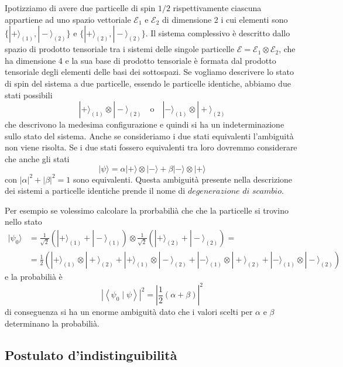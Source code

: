  
 Ipotizziamo di avere due particelle di spin $1/2$ rispettivamente ciascuna appartiene ad uno spazio vettoriale $\mathcal{E}_1$ e $\mathcal{E}_2$ di dimensione 2 i cui elementi sono $\{|+\rangle_{(1)},|-\rangle_{(2)}\}$ e $\{|+\rangle_{(2)},|-\rangle_{(2)}\}$. Il sistema complessivo \`e descritto dallo spazio di prodotto tensoriale tra i sistemi delle singole particelle $\mathcal{E} = \mathcal{E}_1 \otimes \mathcal{E}_2$, che ha dimensione 4 e la sua base di prodotto tensoriale \`e formata dal prodotto tensoriale degli elementi delle basi dei sottospazi. Se vogliamo descrivere lo stato di spin del sistema a due particelle, essendo le particelle identiche, abbiamo due stati possibili
 \begin{equation*}
 	|+\rangle_{(1)} \otimes |- \rangle_{(2)} \quad \text{o} \quad |-\rangle_{(1)} \otimes |+\rangle_{(2)}
 \end{equation*}
 che descrivono la medesima configurazione e quindi si ha un indeterminazione sullo stato del sistema. Anche se consideriamo i due stati equivalenti l'ambiguit\`a non viene risolta. Se i due stati  fossero equivalenti tra loro dovremmo considerare che anche gli stati 
 \begin{equation*}
 	|\psi \rangle = \alpha |+\rangle \otimes |- \rangle + \beta |-\rangle \otimes |+\rangle
 \end{equation*}
con $|\alpha|^2 + |\beta|^2 =1 $ sono equivalenti. Questa ambiguit\`a presente nella descrizione dei sistemi a particelle identiche prende il nome di $\textit{degenerazione di scambio}$.

Per esempio se volessimo calcolare la prorbabili\`a che che la particelle si trovino nello stato 
\begin{align*}
	|\psi_0 \rangle & = \frac{1}{\sqrt{2}}(|+ \rangle_{(1)} + |-\rangle_{(1)}) \otimes \frac{1}{\sqrt{2}}(|+\rangle_{(2)}+|-\rangle_{(2)}) = \\[0.4cm]
	&=\frac{1}{2}\left(|+\rangle_{(1)} \otimes|+\rangle_{(2)}+|+\rangle_{(1)} \otimes|-\rangle_{(2)}+|-\rangle_{(1)} \otimes|+\rangle_{(2)}+|-\rangle_{(1)} \otimes|-\rangle_{(2)}\right)  
\end{align*}
e la probabili\`a \`e 
\begin{equation*}
	\left|\left\langle\psi_0 \mid \psi\right\rangle\right|^2=\left|\frac{1}{2}(\alpha+\beta)\right|^2
\end{equation*}
di conseguenza si ha un enorme ambiguit\`a dato che i valori scelti per $\alpha $ e $\beta $ determinano la probabili\`a.

\subsection{Postulato d'indistinguibilit\`a }

